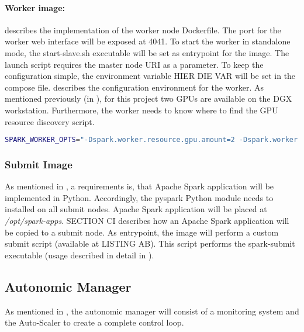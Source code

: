 \paragraph{Worker image:}
 describes the implementation of the worker node Dockerfile.
The port for the worker web interface will be exposed at 4041.
To start the worker in standalone mode, the start-slave.sh executable will be set as entrypoint for the image.
The launch script requires the master node URI as a parameter. To keep the configuration simple, the environment variable HIER DIE VAR will be set in the compose file.
 describes the configuration environment for the worker. As mentioned previously (in ), for this project two GPUs are available on the DGX workstation. Furthermore, the worker needs to know where to find the GPU resource discovery script.

\begin{lstlisting}[label=lst:06_computing_spark_worker-env, caption=Environment configuration for all worker nodes, language=bash]
SPARK_WORKER_OPTS="-Dspark.worker.resource.gpu.amount=2 -Dspark.worker.resource.gpu.discoveryScript=/opt/sparkRapidsPlugin/getGpusResources.sh"
\end{lstlisting}


\subsubsection{Submit Image}
As mentioned in , a requirements is, that Apache Spark application will be implemented in Python. Accordingly, the pyspark Python module needs to installed on all submit nodes.
Apache Spark application will be placed at \textit{/opt/spark-apps}. SECTION CI describes how an Apache Spark application will be copied to a submit node.
As entrypoint, the image will perform a custom submit script (available at LISTING AB). This script performs the spark-submit executable (usage described in detail in ).


\subsection{Autonomic Manager}
As mentioned in , the autonomic manager will consist of a monitoring system and the Auto-Scaler to create a complete control loop.

